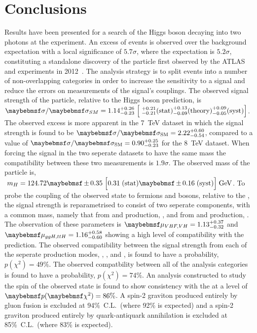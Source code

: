 \chapter{Conclusions}
\label{chap:conclusions}

Results have been presented for a search of the \SM Higgs boson decaying into two photons at the \CMS experiment. An excess of events is observed over the background expectation with a local significance of $5.7\sigma$, where the \SM expectation is $5.2\sigma$, constituting a standalone discovery of the particle first observed by the ATLAS and \CMS experiments in 2012~\cite{ATLASDiscovery,CMSDiscovery}. The analysis strategy is to split events into a number of non-overlapping categories in order to increase the sensitivity to a signal and reduce the errors on measurements of the signal's couplings. The observed signal strength of the particle, relative to the \SM Higgs boson prediction, is $\sigma/\sigma_{SM} = 1.14^{+0.26}_{-0.23} \;\Bigl[\;^{+0.21}_{-0.21} \mathrm{(stat)} ^{+0.13}_{-0.09} \mathrm{(theory)} ^{+0.09}_{-0.05} \mathrm{(syst)} \Bigr]$. The observed excess is more apparent in the 7~TeV dataset in which the signal strength is found to be $\musm=2.22^{+0.60}_{-0.54}$, compared to a value of $\musm=0.90^{+0.25}_{-0.23}$ for the 8~TeV dataset. When forcing the signal in the two seperate datasets to have the same mass the compatibility between these two measurements is $1.9\sigma$. The observed mass of the particle is, $\;m_{H} = 124.72 \pm 0.35 \; \Bigl[ 0.31 \mathrm{\;(stat)} \pm 0.16 \mathrm{\;(syst)} \Bigr] \mathrm{\;GeV}$. To probe the coupling of the observed state to fermions and bosons, relative to the \SM, the signal strength is reparametrised to consist of two seperate components, with a common mass, namely that from \ggH and \ttH production, \RF, and from \VBF and \VH production, \RV. The observation of these parameters is $\RF=1.13^{+0.37}_{-0.32}$ and $\RV=1.16^{+0.58}_{-0.60}$ showing a high level of compatibility with the \SM prediction. The observed compatibility between the signal strength from each of the seperate production modes, \ggH, \VBF, \VH and \ttH, is found to have a probability, $p(\chi^{2})=49\%$. The observed compatbility between all of the analysis categories is found to have a probability, $p(\chi^{2})=74\%$. An analysis constructed to study the spin of the observed state is found to show consistency with the \SM at a level of $\p(\chi^{2})=86\%$. A spin-2 graviton produced entirely by gluon fusion is excluded at 94\%~C.L.~(where 92\% is expected) and a spin-2 graviton produced entirely by quark-antiquark annihilation is excluded at 85\%~C.L.~(where 83\% is expected).

